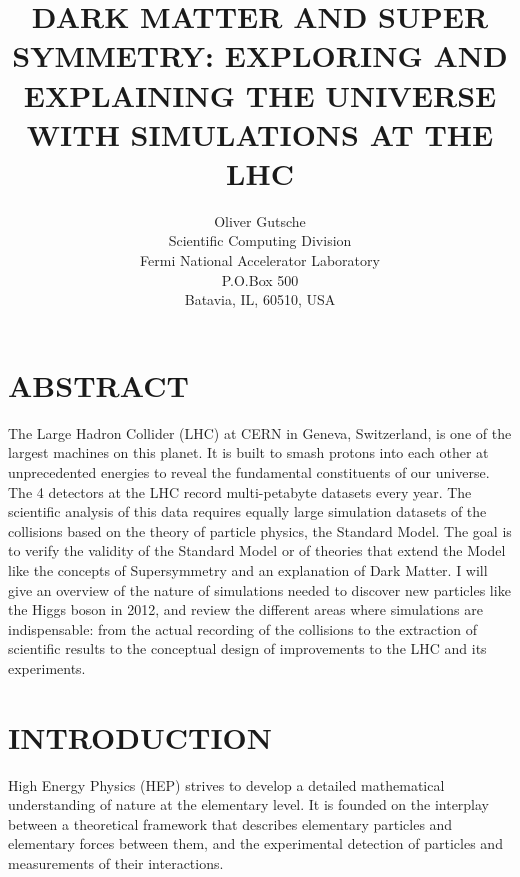 \documentclass{wscpaperproc}
\theoremstyle{wsc}
\begin{document}
%
%

\title{DARK MATTER AND SUPER SYMMETRY: EXPLORING AND EXPLAINING THE UNIVERSE WITH SIMULATIONS AT THE LHC}

\author{Oliver Gutsche\\ [12pt]
Scientific Computing Division \\
Fermi National Accelerator Laboratory\\
P.O.Box 500\\
Batavia, IL, 60510, USA\\
}

\maketitle

\section*{ABSTRACT}
The Large Hadron Collider (LHC) at CERN in Geneva, Switzerland, is one of the largest machines on this planet. It is built to smash protons into each other at unprecedented energies to reveal the fundamental constituents of our universe. The 4 detectors at the LHC record multi-petabyte datasets every year. The scientific analysis of this data requires equally large simulation datasets of the collisions based on the theory of particle physics, the Standard Model. The goal is to verify the validity of the Standard Model or of theories that extend the Model like the concepts of Supersymmetry and an explanation of Dark Matter. I will give an overview of the nature of simulations needed to discover new particles like the Higgs boson in 2012, and review the different areas where simulations are indispensable: from the actual recording of the collisions to the extraction of scientific results to the conceptual design of improvements to the LHC and its experiments.

\section{INTRODUCTION}
\label{sec:intro}
High Energy Physics (HEP) strives to develop a detailed mathematical understanding of nature at the elementary level. It is founded on the interplay between a theoretical framework that describes elementary particles and elementary forces between them, and the experimental detection of particles and measurements of their interactions.
\end{document}
